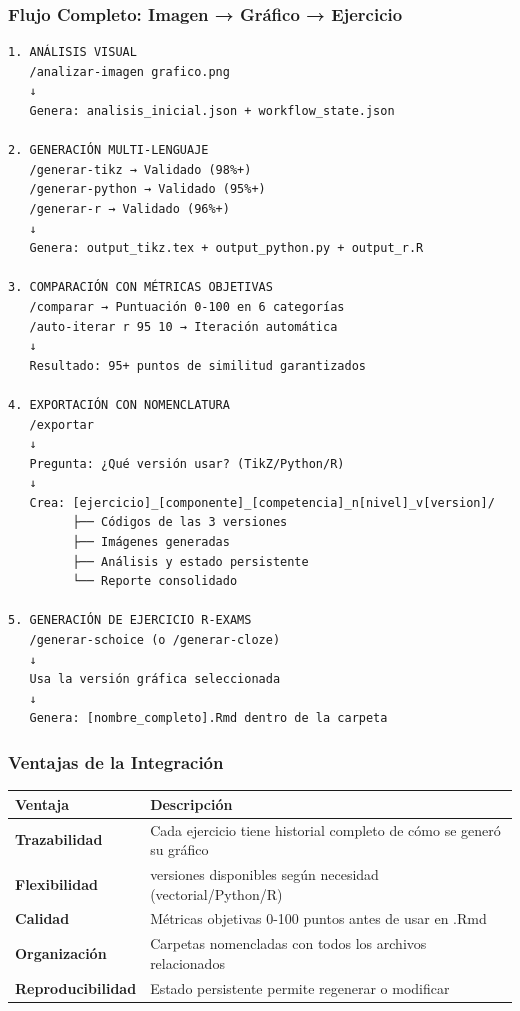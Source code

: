 \documentclass[
]{article}
\begin{document}
\subsubsection{Flujo Completo: Imagen → Gráfico →
Ejercicio}\label{flujo-completo-imagen-gruxe1fico-ejercicio}

\begin{verbatim}
1. ANÁLISIS VISUAL
   /analizar-imagen grafico.png
   ↓
   Genera: analisis_inicial.json + workflow_state.json

2. GENERACIÓN MULTI-LENGUAJE
   /generar-tikz → Validado (98%+)
   /generar-python → Validado (95%+)
   /generar-r → Validado (96%+)
   ↓
   Genera: output_tikz.tex + output_python.py + output_r.R

3. COMPARACIÓN CON MÉTRICAS OBJETIVAS
   /comparar → Puntuación 0-100 en 6 categorías
   /auto-iterar r 95 10 → Iteración automática
   ↓
   Resultado: 95+ puntos de similitud garantizados

4. EXPORTACIÓN CON NOMENCLATURA
   /exportar
   ↓
   Pregunta: ¿Qué versión usar? (TikZ/Python/R)
   ↓
   Crea: [ejercicio]_[componente]_[competencia]_n[nivel]_v[version]/
         ├── Códigos de las 3 versiones
         ├── Imágenes generadas
         ├── Análisis y estado persistente
         └── Reporte consolidado

5. GENERACIÓN DE EJERCICIO R-EXAMS
   /generar-schoice (o /generar-cloze)
   ↓
   Usa la versión gráfica seleccionada
   ↓
   Genera: [nombre_completo].Rmd dentro de la carpeta
\end{verbatim}

\subsubsection{Ventajas de la
Integración}\label{ventajas-de-la-integraciuxf3n}

\begin{longtable}[]{@{}
  >{\raggedright\arraybackslash}p{}
  >{\raggedright\arraybackslash}p{}@{}}
\toprule\noalign{}
\begin{minipage}[b]{\linewidth}\raggedright
Ventaja
\end{minipage} & \begin{minipage}[b]{\linewidth}\raggedright
Descripción
\end{minipage} \\
\midrule\noalign{}
\endhead
\bottomrule\noalign{}
\endlastfoot
\textbf{Trazabilidad} & Cada ejercicio tiene historial completo de cómo
se generó su gráfico \\
\textbf{Flexibilidad} & 3 versiones disponibles según necesidad
(vectorial/Python/R) \\
\textbf{Calidad} & Métricas objetivas 0-100 puntos antes de usar en
.Rmd \\
\textbf{Organización} & Carpetas nomencladas con todos los archivos
relacionados \\
\textbf{Reproducibilidad} & Estado persistente permite regenerar o
modificar \\
\end{longtable}
\end{document}
